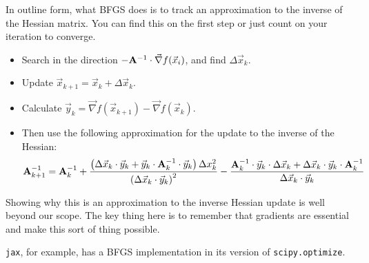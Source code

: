 In outline form, what BFGS does is to track an approximation to the
inverse of the Hessian matrix. You can find this on the first step or
just count on your iteration to converge.
\begin{itemize}
 \item Search in the direction
 $-{\bf A}^{-1}\cdot \vec{\nabla}f(\vec{x}_i)$, and find
 $\Delta\vec{x}_k$.
 \item Update $\vec{x}_{k+1} = \vec{x}_k + \Delta\vec{x}_k$.
 \item Calculate $\vec{y}_k = \vec{\nabla}f(\vec{x}_{k+1})
 - \vec{\nabla}f(\vec{x}_k)$.
 \item Then use the following approximation for the update to the
 inverse of the Hessian:
 \begin{equation}
   {\bf A}^{-1}_{k+1} = {\bf A}^{-1}_k +
   \frac{\left(\Delta\vec{x}_k\cdot\vec{y}_k
 + \vec{y}_k\cdot{\bf A}^{-1}_k\cdot\vec{y}_k \right) \Delta x_k^2}
   {\left(\Delta\vec{x}_k\cdot\vec{y}_k\right)^2}
 - \frac{{\bf A}^{-1}_k\cdot\vec{y}_k\cdot\Delta\vec{x}_k
 + \Delta\vec{x}_k \cdot\vec{y}_k\cdot{\bf A}^{-1}_k}{\Delta\vec{x}_k\cdot\vec{y}_k}
 \end{equation}
\end{itemize}

Showing why this is an approximation to the inverse Hessian update is
well beyond our scope. The key thing here is to remember that
gradients are essential and make this sort of thing possible.

{\tt jax}, for example, has a BFGS implementation in its version of
{\tt scipy.optimize}.
